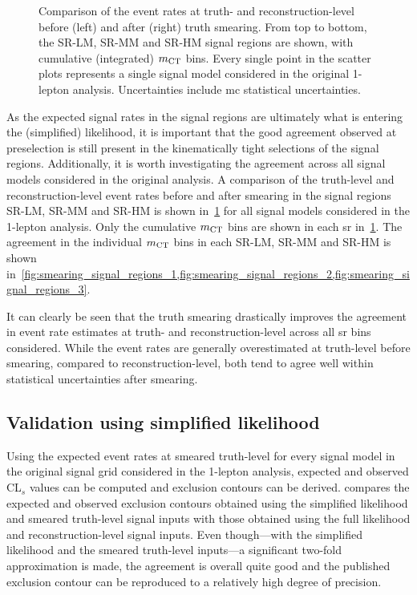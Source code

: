 \begin{figure}
\begin{subfigure}[b]{0.49\linewidth}
	\end{subfigure}
	\caption{Comparison of the event rates at truth- and reconstruction-level before (left) and after (right) truth smearing. From top to bottom, the SR-LM, SR-MM and SR-HM signal regions are shown, with cumulative (integrated) $m_{\textrm{CT}}$ bins. Every single point in the scatter plots represents a single signal model considered in the original 1-lepton analysis. Uncertainties include \gls{mc} statistical uncertainties.}
	\label{fig:smearing_signal_regions}
\end{figure}
 
 As the expected signal rates in the signal regions are ultimately what is entering the (simplified) likelihood, it is important that the good agreement observed at preselection is still present in the kinematically tight selections of the signal regions. Additionally, it is worth investigating the agreement across all signal models considered in the original analysis. A comparison of the truth-level and reconstruction-level event rates before and after smearing in the signal regions SR-LM, SR-MM and SR-HM is shown in~\cref{fig:smearing_signal_regions} for all signal models considered in the 1-lepton analysis. Only the cumulative $m_{\textrm{CT}}$ bins are shown in each \gls{sr} in~\cref{fig:smearing_signal_regions}. The agreement in the individual $m_{\textrm{CT}}$ bins in each SR-LM, SR-MM and SR-HM is shown in~\cref{fig:smearing_signal_regions_1,fig:smearing_signal_regions_2,fig:smearing_signal_regions_3}.
 
 It can clearly be seen that the truth smearing drastically improves the agreement in event rate estimates at truth- and reconstruction-level across all \gls{sr} bins considered. While the event rates are generally overestimated at truth-level before smearing, compared to reconstruction-level, both tend to agree well within statistical uncertainties after smearing. 
 
\subsection{Validation using simplified likelihood}

Using the expected event rates at smeared truth-level for every signal model in the original signal grid considered in the 1-lepton analysis, expected and observed CL$_s$ values can be computed and exclusion contours can be derived.  compares the expected and observed exclusion contours obtained using the simplified likelihood and smeared truth-level signal inputs with those obtained using the full likelihood and reconstruction-level signal inputs. Even though---with the simplified likelihood and the smeared truth-level inputs---a significant two-fold approximation is made, the agreement is overall quite good and the published exclusion contour can be reproduced to a relatively high degree of precision. 

